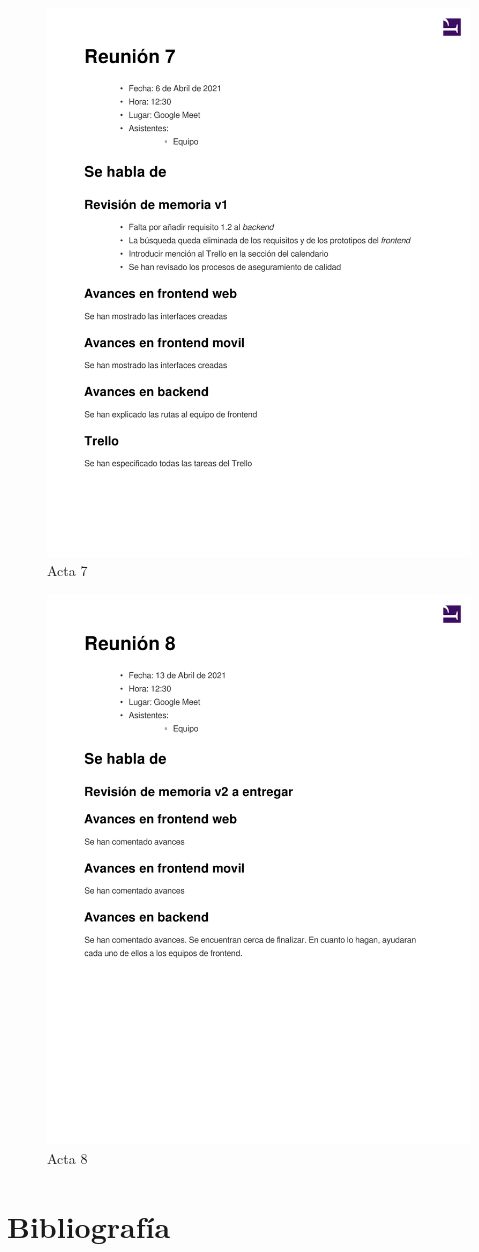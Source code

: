 \documentclass{article}
\begin{document}
\begin{figure}
    \includegraphics[width=.8\textwidth]{../../actas_reuniones/acta7.pdf}
    \caption{Acta 7}
\end{figure}
\begin{figure}
    \includegraphics[width=.8\textwidth]{../../actas_reuniones/acta8.pdf}
    \caption{Acta 8}
\end{figure}

\section*{Bibliografía}
\end{document}
